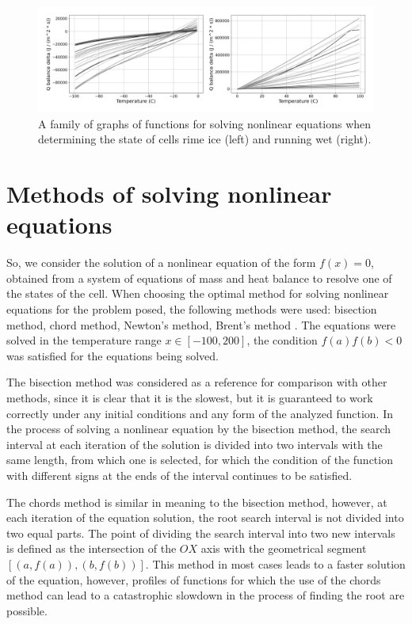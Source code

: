 \documentclass[
11pt,%
tightenlines,%
twoside,%
onecolumn,%
nofloats,%
nobibnotes,%
nofootinbib,%
superscriptaddress,%
noshowpacs,%
centertags]%
{revtex4}
\begin{document}
\begin{figure}[h]
\setcaptionmargin{5mm}
\onelinecaptionstrue
\includegraphics[width=1.0\textwidth]{pics/dq_rime_wet.pdf}
\caption{A family of graphs of functions for solving nonlinear equations when determining the state of cells rime ice (left) and running wet (right).}\label{fig:dq_rime_wet}
\end{figure}

\section{Methods of solving nonlinear equations}

So, we consider the solution of a nonlinear equation of the form $f(x) = 0$, obtained from a system of equations of mass and heat balance to resolve one of the states of the cell.
When choosing the optimal method for solving nonlinear equations for the problem posed, the following methods were used: bisection method, chord method, Newton's method, Brent's method \cite{Press}.
The equations were solved in the temperature range $x \in [-100, 200]$, the condition $f(a)f(b) < 0$ was satisfied for the equations being solved.

The bisection method was considered as a reference for comparison with other methods, since it is clear that it is the slowest, but it is guaranteed to work correctly under any initial conditions and any form of the analyzed function.
In the process of solving a nonlinear equation by the bisection method, the search interval at each iteration of the solution is divided into two intervals with the same length, from which one is selected, for which the condition of the function with different signs at the ends of the interval continues to be satisfied.

The chords method is similar in meaning to the bisection method, however, at each iteration of the equation solution, the root search interval is not divided into two equal parts.
The point of dividing the search interval into two new intervals is defined as the intersection of the $OX$ axis with the geometrical segment $[(a, f (a)), (b, f (b))]$.
This method in most cases leads to a faster solution of the equation, however, profiles of functions for which the use of the chords method can lead to a catastrophic slowdown in the process of finding the root are possible.
\end{document}
